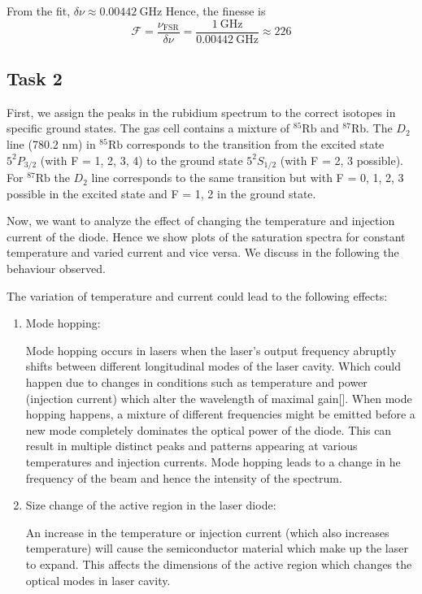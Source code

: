 \documentclass{article}
\begin{document}
From the fit, $\delta \nu \approx 0.00442 \ \text{GHz}$ Hence, the finesse is \[ \mathscr{F} = \frac{\nu_{\text{FSR}}}{\delta \nu} = \frac{1 \ \text{GHz}}{0.00442 \ \text{GHz}} \approx 226\]

\pagebreak{}

\subsection{Task 2}

First, we assign the peaks in the rubidium spectrum to the correct isotopes in specific ground states. The gas cell contains a mixture of $^{85}\text{Rb}$ and $^{87}\text{Rb}$. The $D_2$ line (780.2 nm) in $^{85}\text{Rb}$ corresponds to the transition from the excited state $5^2P_{3/2}$ (with F = 1, 2, 3, 4) to the ground state $5^2S_{1/2}$ (with F = 2, 3 possible). For $^{87}\text{Rb}$ the $D_2$ line corresponds to the same transition but with F = 0, 1, 2, 3 possible in the excited state and F = 1, 2 in the ground state.

Now, we want to analyze the effect of changing the temperature and injection current of the diode. Hence we show plots of the saturation spectra for constant temperature and varied current and vice versa. We discuss in the following the behaviour observed. 

The variation of temperature and current could lead to the following effects: 

\begin{enumerate}
\item Mode hopping:

Mode hopping occurs in lasers when the laser's output frequency abruptly shifts between different longitudinal modes of the laser cavity. Which could happen due to changes in conditions such as temperature and power (injection current) which alter the wavelength of maximal gain[]. When mode hopping happens, a mixture of different frequencies might be emitted before a new mode completely dominates the optical power of the diode. This can result in multiple distinct peaks and patterns appearing at various temperatures and injection currents. Mode hopping leads to a change in he frequency of the beam and hence the intensity of the spectrum. 

\item Size change of the active region in the laser diode: 

An increase in the temperature or injection current (which also increases temperature) will cause the semiconductor material which make up the laser to expand. This affects the dimensions of the active region which changes the optical modes in laser cavity.

\end{enumerate}
\end{document}

